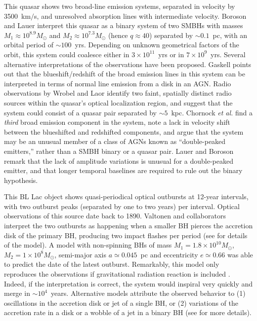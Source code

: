 \documentclass[]{iopart}
\begin{document}
%
This quasar shows two broad-line emission systems, separated in velocity by
3500~km$/$s, and unresolved absorption lines with intermediate
velocity. Boroson and Lauer \cite{Boroson:2009va} interpret this quasar 
as a binary system of two SMBHs with masses $M_1\approx
10^{8.9}M_\odot$ and $M_2\approx 10^{7.3}M_\odot$ (hence $q\approx 40$)
separated by $\sim 0.1$~pc, with an orbital period of $\sim 100$~yrs. 
Depending on unknown geometrical factors of the
orbit, this system could coalesce either in $3\times 10^{11}$~yrs or in
$7\times 10^9$~yrs. 
%
Several alternative interpretations of the observations have been proposed.
Gaskell \cite{Gaskell:2009av} points out that the blueshift/redshift of the
broad emission lines in this system can be interpreted in terms of normal line
emission from a disk in an AGN.  Radio observations by Wrobel and Laor
\cite{Wrobel:2009na} identify two faint, spatially distinct radio sources
within the quasar's optical localization region, and suggest that the system
could consist of a quasar pair separated by $\sim 5$~kpc.  Chornock {\it et
  al.}  \cite{ChornockB,Chornock:2009sb} find a {\it third} broad emission
component in the system, note a lack in velocity shift between the blueshifted
and redshifted components, and argue that the system may be an unusual member
of a class of AGNs known as ``double-peaked emitters,'' rather than a SMBH
binary or a quasar pair.  Lauer and Boroson \cite{Lauer:2009us} remark that
the lack of amplitude variations is unusual for a double-peaked emitter, and
that longer temporal baselines are required to rule out the binary hypothesis.

%
This BL Lac object shows quasi-periodical optical outbursts at 12-year
intervals, with two outburst peaks (separated by one to two years) per
interval. Optical observations of this source date back to 1890. Valtonen and
collaborators interpret the two outbursts as happening when a smaller BH
pierces the accretion disk of the primary BH, producing two impact flashes per
period (see \cite{Valtonen:2007} for details of the model).  A model with
non-spinning BHs of mass $M_1=1.8\times 10^{10}M_\odot$, $M_2=1\times
10^8M_\odot$, semi-major axis
$a\simeq 0.045$~pc and eccentricity $e\simeq 0.66$ was able to predict the
date of the latest outburst. Remarkably, this model only reproduces the
observations if gravitational radiation reaction is included
\cite{Valtonen:2008tx}. Indeed, if the interpretation is correct, the system
would inspiral very quickly and merge in $\sim 10^4$~years.  Alternative
models attribute the observed behavior to (1) oscillations in the accretion
disk or jet of a single BH, or (2) variations of the accretion rate in a disk
or a wobble of a jet in a binary BH (see \cite{Komossa:2002tn,Valtonen:2008tx}
for more details).
\end{document}
